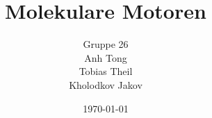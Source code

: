 \documentclass[
    a4paper,
    ngerman,
    11pt
]{scrartcl}
\title{Molekulare Motoren}
\author{Gruppe 26\\ Anh Tong \\ Tobias Theil \\ Kholodkov Jakov }
\date{\today}
\begin{document}
	
\maketitle
\tableofcontents



\newpage





 


\begin{appendix}

\end{appendix}
 
\end{document}
